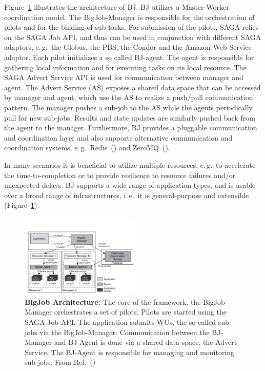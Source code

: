 \documentclass{sig-alternate}
\begin{document}
Figure~\ref{fig:figures_re_bigjob_interactions} illustrates the
architecture of BJ. BJ utilizes a Master-Worker coordination
model. The BigJob-Manager is responsible for the orchestration of
pilots and for the binding of sub-tasks. For submission of the pilots,
SAGA relies on the SAGA Job API, and thus can be used in conjunction
with different SAGA adaptors, e.\,g.\ the Globus, the PBS, the Condor
and the Amazon Web Service adaptor. Each pilot initializes a so called
BJ-agent. The agent is responsible for gathering local information and
for executing tasks on its local resource. The SAGA Advert Service API
is used for communication between manager and agent. The Advert
Service (AS) exposes a shared data space that can be accessed by
manager and agent, which use the AS to realize a push/pull
communication pattern.  The manager pushes a sub-job to the AS while
the agents periodically pull for new sub-jobs. Results and state
updates are similarly pushed back from the agent to the
manager. Furthermore, BJ provides a pluggable communication and
coordination layer and also supports 
alternative communication and coordination systems,
e.\,g.\ Redis~(\cite{redis}) and ZeroMQ~(\cite{zmq}).

In many scenarios it is beneficial to utilize multiple resources,
e.\,g.\ to accelerate the time-to-completion or to provide resilience
to resource failures and/or unexpected delays.  BJ supports a wide
range of application types, and is usable over a broad range of
infrastructures, i.\,e.\ it is general-purpose and extensible
(Figure~\ref{fig:figures_re_bigjob_interactions}). 


\begin{figure}[t]
  \centering
  \includegraphics[width=0.51\textwidth]{./figs/re_bigjob_interactions}
   \caption{\textbf{BigJob Architecture:} The core of the framework,
     the BigJob-Manager orchestrates a set of pilots. Pilots are
     started using the SAGA Job API. The application submits WUs, the
     so-called sub-jobs via the BigJob-Manager. Communication between
     the BJ-Manager and BJ-Agent is done via a shared data space, the
     Advert Service. The BJ-Agent is responsible for managing and
     monitoring sub-jobs. From Ref.~(\cite{saga_bigjob_condor_cloud})}
        \label{fig:figures_re_bigjob_interactions}
\end{figure}
\end{document}
